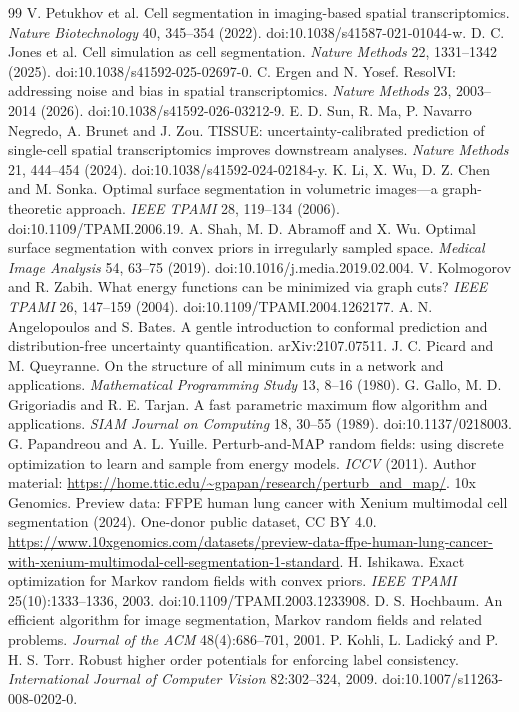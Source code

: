 \documentclass[10pt,letterpaper]{article}
\begin{document}
\begin{thebibliography}{99}
 V. Petukhov et al. Cell segmentation in imaging-based spatial transcriptomics. \emph{Nature Biotechnology} 40, 345--354 (2022). doi:10.1038/s41587-021-01044-w.
 D. C. Jones et al. Cell simulation as cell segmentation. \emph{Nature Methods} 22, 1331--1342 (2025). doi:10.1038/s41592-025-02697-0.
 C. Ergen and N. Yosef. ResolVI: addressing noise and bias in spatial transcriptomics. \emph{Nature Methods} 23, 2003--2014 (2026). doi:10.1038/s41592-026-03212-9.
 E. D. Sun, R. Ma, P. Navarro Negredo, A. Brunet and J. Zou. TISSUE: uncertainty-calibrated prediction of single-cell spatial transcriptomics improves downstream analyses. \emph{Nature Methods} 21, 444--454 (2024). doi:10.1038/s41592-024-02184-y.
 K. Li, X. Wu, D. Z. Chen and M. Sonka. Optimal surface segmentation in volumetric images---a graph-theoretic approach. \emph{IEEE TPAMI} 28, 119--134 (2006). doi:10.1109/TPAMI.2006.19.
 A. Shah, M. D. Abramoff and X. Wu. Optimal surface segmentation with convex priors in irregularly sampled space. \emph{Medical Image Analysis} 54, 63--75 (2019). doi:10.1016/j.media.2019.02.004.
 V. Kolmogorov and R. Zabih. What energy functions can be minimized via graph cuts? \emph{IEEE TPAMI} 26, 147--159 (2004). doi:10.1109/TPAMI.2004.1262177.
 A. N. Angelopoulos and S. Bates. A gentle introduction to conformal prediction and distribution-free uncertainty quantification. arXiv:2107.07511.
 J. C. Picard and M. Queyranne. On the structure of all minimum cuts in a network and applications. \emph{Mathematical Programming Study} 13, 8--16 (1980).
 G. Gallo, M. D. Grigoriadis and R. E. Tarjan. A fast parametric maximum flow algorithm and applications. \emph{SIAM Journal on Computing} 18, 30--55 (1989). doi:10.1137/0218003.
 G. Papandreou and A. L. Yuille. Perturb-and-MAP random fields: using discrete optimization to learn and sample from energy models. \emph{ICCV} (2011). Author material: \url{https://home.ttic.edu/~gpapan/research/perturb_and_map/}.
 10x Genomics. Preview data: FFPE human lung cancer with Xenium multimodal cell segmentation (2024). One-donor public dataset, CC BY 4.0. \url{https://www.10xgenomics.com/datasets/preview-data-ffpe-human-lung-cancer-with-xenium-multimodal-cell-segmentation-1-standard}.
 H. Ishikawa. Exact optimization for Markov random fields with convex priors. \emph{IEEE TPAMI} 25(10):1333--1336, 2003. doi:10.1109/TPAMI.2003.1233908.
 D. S. Hochbaum. An efficient algorithm for image segmentation, Markov random fields and related problems. \emph{Journal of the ACM} 48(4):686--701, 2001.
 P. Kohli, L. Ladick\'{y} and P. H. S. Torr. Robust higher order potentials for enforcing label consistency. \emph{International Journal of Computer Vision} 82:302--324, 2009. doi:10.1007/s11263-008-0202-0.
\end{thebibliography}
\end{document}
